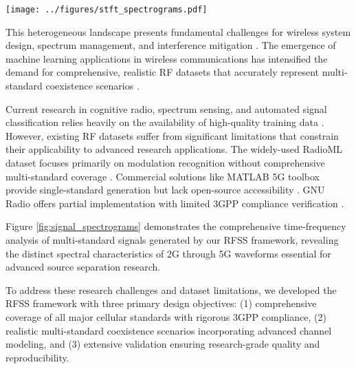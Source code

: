\documentclass[twocolumn]{article}
\begin{document}
\begin{figure*}[t]
\centering
\texttt{[image: ../figures/stft\_spectrograms.pdf]}
\caption{STFT spectrograms of multi-standard RF signals showing time-frequency characteristics. Individual spectrograms demonstrate the unique spectral signatures of GSM, UMTS, LTE, and 5G NR signals, revealing their distinct modulation schemes and bandwidth utilization patterns essential for source separation research.}
\label{fig:signal_spectrograms}
\end{figure*}

This heterogeneous landscape presents fundamental challenges for wireless system design, spectrum management, and interference mitigation \cite{haykin2005cognitive,goldsmith2009breaking}. The emergence of machine learning applications in wireless communications has intensified the demand for comprehensive, realistic RF datasets that accurately represent multi-standard coexistence scenarios \cite{oshea2017introduction,west2017deep}.

Current research in cognitive radio, spectrum sensing, and automated signal classification relies heavily on the availability of high-quality training data \cite{oshea2018over,oshea2016convolutional,rajendran2018deep}. However, existing RF datasets suffer from significant limitations that constrain their applicability to advanced research applications. The widely-used RadioML dataset focuses primarily on modulation recognition without comprehensive multi-standard coverage \cite{oshea2016radio}. Commercial solutions like MATLAB 5G toolbox provide single-standard generation but lack open-source accessibility \cite{west2017deep}. GNU Radio offers partial implementation with limited 3GPP compliance verification \cite{blossom2004gnu}.

Figure \ref{fig:signal_spectrograms} demonstrates the comprehensive time-frequency analysis of multi-standard signals generated by our RFSS framework, revealing the distinct spectral characteristics of 2G through 5G waveforms essential for advanced source separation research.

To address these research challenges and dataset limitations, we developed the RFSS framework with three primary design objectives: (1) comprehensive coverage of all major cellular standards with rigorous 3GPP compliance, (2) realistic multi-standard coexistence scenarios incorporating advanced channel modeling, and (3) extensive validation ensuring research-grade quality and reproducibility.
\end{document}

